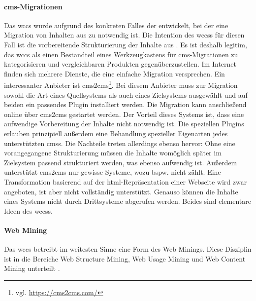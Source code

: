         \paragraph{\gls{cms}-Migrationen}
        Das \gls{wccs} wurde aufgrund des konkreten Falles der {\fernUni}
        entwickelt, bei der eine Migration von Inhalten aus {\wordpress} zu {\imperia} notwendig ist.
        Die Intention des \glspl{wccs} für diesen Fall ist die vorbereitende Strukturierung der
        Inhalte aus {\wordpress}.
        Es ist deshalb legitim, das \gls{wccs} als einen Bestandteil eines Werkzeugkastens
        für \gls{cms}-Migrationen zu kategorisieren und vergleichbaren Produkten gegenüberzustellen.
        Im Internet finden sich mehrere Dienste, die eine einfache Migration versprechen.
        Ein interessanter Anbieter ist cms2cms\footnote{vgl. \url{https://cms2cms.com/}}.
        Bei diesem Anbieter muss zur Migration sowohl die Art eines Quellsystems als auch eines Zielsystems ausgewählt
        und auf beiden ein passendes Plugin installiert werden.
        Die Migration kann anschließend online über cms2cms gestartet werden.
        Der Vorteil dieses Systems ist,
        dass eine aufwendige Vorbereitung der Inhalte nicht notwendig ist.
        Die speziellen Plugins erlauben prinzipiell außerdem eine Behandlung spezieller
        Eigenarten jedes unterstützten \glspl{cms}.
        Die Nachteile treten allerdings ebenso hervor: Ohne eine vorangegangene Strukturierung
        müssen die Inhalte womöglich später im Zielsystem passend strukturiert werden,
        was ebenso aufwendig ist.
        Außerdem unterstützt cms2cms nur gewisse Systeme,
        wozu {\imperia} bspw. nicht zählt.
        Eine Transformation basierend auf der \gls{html}-Repräsentation einer Webseite wird zwar angeboten,
        ist aber nicht vollständig unterstützt.
        Genauso können die Inhalte eines Systems nicht durch Drittsysteme abgerufen werden.
        Beides sind elementare Ideen des \glspl{wccs}.

        \paragraph{Web Mining}
        Das \gls{wccs} betreibt im weitesten Sinne eine Form des Web Minings.
        Diese Disziplin ist in die Bereiche Web Structure Mining,
        Web Usage Mining und Web Content Mining unterteilt
        \cite{markov:webMining}.

